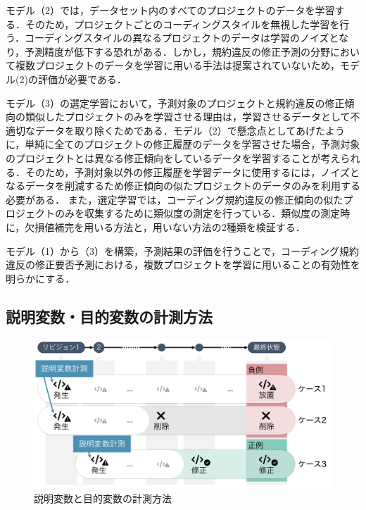 \documentclass[paper]{ieicej}
\begin{document}
モデル（2）では，データセット内のすべてのプロジェクトのデータを学習する．そのため，プロジェクトごとのコーディングスタイルを無視した学習を行う．コーディングスタイルの異なるプロジェクトのデータは学習のノイズとなり，予測精度が低下する恐れがある．しかし，規約違反の修正予測の分野において複数プロジェクトのデータを学習に用いる手法は提案されていないため，モデル(2)の評価が必要である．

モデル（3）の選定学習において，予測対象のプロジェクトと規約違反の修正傾向の類似したプロジェクトのみを学習させる理由は，学習させるデータとして不適切なデータを取り除くためである．モデル（2）で懸念点としてあげたように，単純に全てのプロジェクトの修正履歴のデータを学習させた場合，予測対象のプロジェクトとは異なる修正傾向をしているデータを学習することが考えられる．そのため，予測対象以外の修正履歴を学習データに使用するには，ノイズとなるデータを削減するため修正傾向の似たプロジェクトのデータのみを利用する必要がある．
また，選定学習では，コーディング規約違反の修正傾向の似たプロジェクトのみを収集するために類似度の測定を行っている．類似度の測定時に，欠損値補完を用いる方法と，用いない方法の2種類を検証する．



モデル（1）から（3）を構築，予測結果の評価を行うことで，コーディング規約違反の修正要否予測における，複数プロジェクトを学習に用いることの有効性を明らかにする．



\subsection{説明変数・目的変数の計測方法}


\begin{figure}[t]
	\centering
	\includegraphics[width=1.0\linewidth]{fig/kameoka_fig2.pdf}
	\caption{説明変数と目的変数の計測方法}
	\label{fig:mokutekihensu}
\end{figure}
\end{document}
